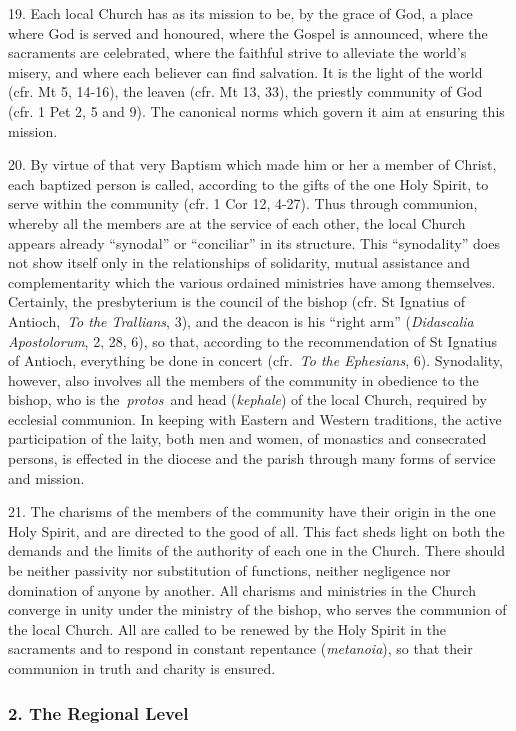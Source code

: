 19. Each local Church has as its mission to be, by the grace of God, a
place where God is served and honoured, where the Gospel is announced,
where the sacraments are celebrated, where the faithful strive to
alleviate the world's misery, and where each believer can find
salvation. It is the light of the world (cfr. Mt 5, 14-16), the leaven
(cfr. Mt 13, 33), the priestly community of God (cfr. 1 Pet 2, 5 and 9).
The canonical norms which govern it aim at ensuring this mission.

20. By virtue of that very Baptism which made him or her a member of
Christ, each baptized person is called, according to the gifts of the
one Holy Spirit, to serve within the community (cfr. 1 Cor 12, 4-27).
Thus through communion, whereby all the members are at the service of
each other, the local Church appears already ``synodal'' or
``conciliar'' in its structure. This ``synodality'' does not show itself
only in the relationships of solidarity, mutual assistance and
complementarity which the various ordained ministries have among
themselves. Certainly, the presbyterium is the council of the bishop
(cfr. St Ignatius of Antioch,~\emph{To the Trallians}, 3), and the
deacon is his ``right arm'' (\emph{Didascalia Apostolorum}, 2, 28, 6),
so that, according to the recommendation of St Ignatius of Antioch,
everything be done in concert (cfr.~\emph{To the Ephesians}, 6).
Synodality, however, also involves all the members of the community in
obedience to the bishop, who is the~\emph{protos}~and head
(\emph{kephale}) of the local Church, required by ecclesial communion.
In keeping with Eastern and Western traditions, the active participation
of the laity, both men and women, of monastics and consecrated persons,
is effected in the diocese and the parish through many forms of service
and mission.

21. The charisms of the members of the community have their origin in
the one Holy Spirit, and are directed to the good of all. This fact
sheds light on both the demands and the limits of the authority of each
one in the Church. There should be neither passivity nor substitution of
functions, neither negligence nor domination of anyone by another. All
charisms and ministries in the Church converge in unity under the
ministry of the bishop, who serves the communion of the local Church.
All are called to be renewed by the Holy Spirit in the sacraments and to
respond in constant repentance (\emph{metanoia}), so that their
communion in truth and charity is ensured.

\subsubsection{2. The Regional Level}\label{the-regional-level}

